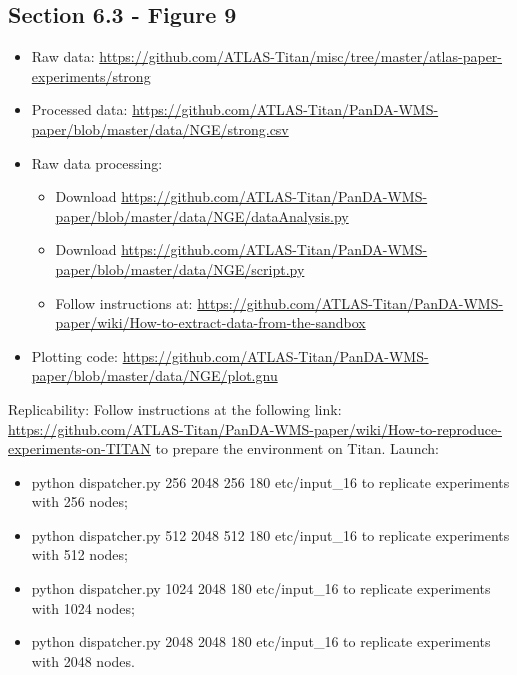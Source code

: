 \subsection{Section 6.3 - Figure 9}
\label{apndx:fig16}

\label{apndx:fig10}
\begin{itemize}
    \item Raw data: \url{https://github.com/ATLAS-Titan/misc/tree/master/atlas-paper-experiments/strong}
     \item Processed data: \url{ https://github.com/ATLAS-Titan/PanDA-WMS-paper/blob/master/data/NGE/strong.csv} 
    \item Raw data processing: 
    	\begin{itemize}
    		\item Download \url{https://github.com/ATLAS-Titan/PanDA-WMS-paper/blob/master/data/NGE/dataAnalysis.py}
    		\item Download \url{https://github.com/ATLAS-Titan/PanDA-WMS-paper/blob/master/data/NGE/script.py}
    		\item Follow instructions at: \url{https://github.com/ATLAS-Titan/PanDA-WMS-paper/wiki/How-to-extract-data-from-the-sandbox}
   	\end{itemize}
    \item Plotting code: \url{https://github.com/ATLAS-Titan/PanDA-WMS-paper/blob/master/data/NGE/plot.gnu}
\end{itemize}

Replicability: Follow instructions at the following link: \url{https://github.com/ATLAS-Titan/PanDA-WMS-paper/wiki/How-to-reproduce-experiments-on-TITAN} to prepare the environment on Titan.
Launch:
\begin{itemize}
\item python dispatcher.py 256  2048 256 180 etc/input_16 to replicate experiments with 256 nodes;
\item python dispatcher.py 512 2048 512 180 etc/input_16 to replicate experiments with 512 nodes;
\item python dispatcher.py 1024 2048 180 etc/input_16 to replicate experiments with 1024 nodes;
\item python dispatcher.py 2048 2048 180 etc/input_16 to replicate experiments with 2048 nodes.
\end{itemize}




